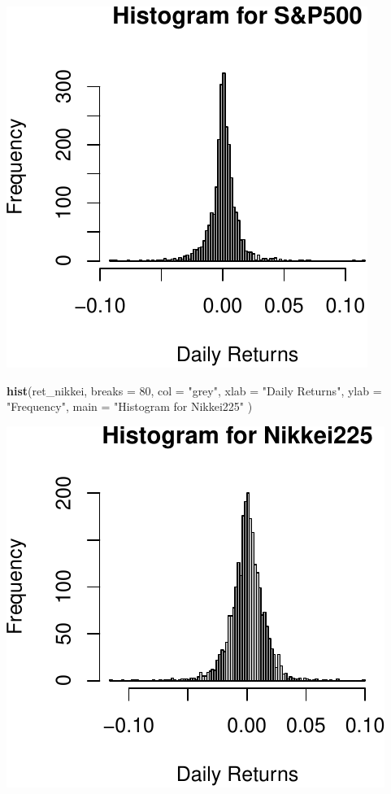 \documentclass[11pt,]{article}
\newenvironment{Shaded}{\begin{snugshade}}{\end{snugshade}}
\newcommand{\KeywordTok}[1]{\textcolor[rgb]{0.13,0.29,0.53}{\textbf{#1}}}
\newcommand{\DataTypeTok}[1]{\textcolor[rgb]{0.13,0.29,0.53}{#1}}
\newcommand{\DecValTok}[1]{\textcolor[rgb]{0.00,0.00,0.81}{#1}}
\newcommand{\StringTok}[1]{\textcolor[rgb]{0.31,0.60,0.02}{#1}}
\newcommand{\NormalTok}[1]{#1}
\begin{document}
\begin{center}\includegraphics{FMC_T4_PhD_Fin_Time_Series_files/figure-latex/histograms-2} \end{center}

\begin{Shaded}
\begin{Highlighting}[]
\KeywordTok{hist}\NormalTok{(ret_nikkei,}
     \DataTypeTok{breaks =} \DecValTok{80}\NormalTok{,}
     \DataTypeTok{col =} \StringTok{"grey"}\NormalTok{,}
     \DataTypeTok{xlab =} \StringTok{"Daily Returns"}\NormalTok{,}
     \DataTypeTok{ylab =} \StringTok{"Frequency"}\NormalTok{,}
     \DataTypeTok{main =} \StringTok{"Histogram for Nikkei225"}
\NormalTok{     )}
\end{Highlighting}
\end{Shaded}

\begin{center}\includegraphics{FMC_T4_PhD_Fin_Time_Series_files/figure-latex/histograms-3} \end{center}
\end{document}

